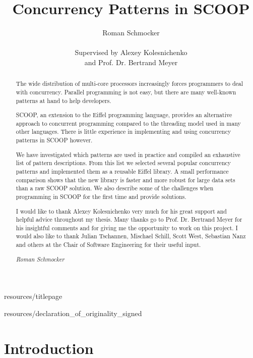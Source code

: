 \documentclass[a4paper,10pt,titlepage]{article}
\title{Concurrency Patterns in SCOOP}
\author{Roman Schmocker \\ \\ Supervised by Alexey Kolesnichenko \\ and Prof. Dr. Bertrand Meyer}
\begin{document}
 {resources/titlepage}

 {resources/declaration_of_originality_signed}

\begin{abstract}
\thispagestyle{plain}
\setcounter{page}{3}
The wide distribution of multi-core processors increasingly forces programmers to deal with concurrency.
Parallel programming is not easy, but there are many well-known patterns at hand to help developers.

SCOOP, an extension to the Eiffel programming language, provides an alternative approach to concurrent programming compared to the threading mo\-del used in many other languages.
There is little experience in implementing and using concurrency patterns in SCOOP however.

We have investigated which patterns are used in practice and compiled an exhaustive list of pattern descriptions.
From this list we selected several popular concurrency patterns and implemented them as a reusable Eiffel library.
A small performance comparison shows that the new library is faster and more robust for large data sets than a raw SCOOP solution.
We also describe some of the challenges when programming in SCOOP for the first time and provide solutions.
\end{abstract}

\renewcommand{\abstractname}{Acknowledgements}
\begin{abstract}
\thispagestyle{plain}
\setcounter{page}{4}
I would like to thank Alexey Kolesnichenko very much for his great support and helpful advice throughout my thesis.
Many thanks go to Prof. Dr. Bertrand Meyer for his insightful comments and for giving me the opportunity to work on this project.
I would also like to thank Julian Tschannen, Mischael Schill, Scott West, Sebastian Nanz and others at the Chair of Software Engineering for their useful input.

\emph{Roman Schmocker}
\end{abstract}


\setcounter{page}{5}
\tableofcontents

\newpage
\mbox{}

\newpage
{}

\section{Introduction}
\label{sec:introduction}
\end{document}

